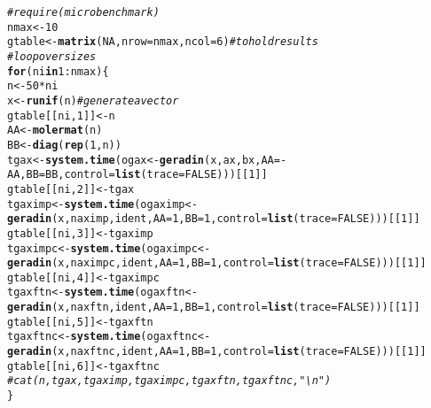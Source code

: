 \documentclass[10pt]{article}\usepackage[]{graphicx}\usepackage[]{color}
\makeatletter
\newcommand{\hlnum}[1]{\textcolor[rgb]{0.686,0.059,0.569}{#1}}%
\newcommand{\hlcom}[1]{\textcolor[rgb]{0.678,0.584,0.686}{\textit{#1}}}%
\newcommand{\hlopt}[1]{\textcolor[rgb]{0,0,0}{#1}}%
\newcommand{\hlstd}[1]{\textcolor[rgb]{0.345,0.345,0.345}{#1}}%
\newcommand{\hlkwa}[1]{\textcolor[rgb]{0.161,0.373,0.58}{\textbf{#1}}}%
\newcommand{\hlkwb}[1]{\textcolor[rgb]{0.69,0.353,0.396}{#1}}%
\newcommand{\hlkwc}[1]{\textcolor[rgb]{0.333,0.667,0.333}{#1}}%
\newcommand{\hlkwd}[1]{\textcolor[rgb]{0.737,0.353,0.396}{\textbf{#1}}}%
\newenvironment{kframe}{%
 \def\at@end@of@kframe{}%
 \ifinner\ifhmode%
  \def\at@end@of@kframe{\end{minipage}}%
  \begin{minipage}{\columnwidth}%
 \fi\fi%
 \def\FrameCommand##1{\hskip\@totalleftmargin \hskip-\fboxsep
 \colorbox{shadecolor}{##1}\hskip-\fboxsep
     \hskip-\linewidth \hskip-\@totalleftmargin \hskip\columnwidth}%
 \MakeFramed {\advance\hsize-\width
   \@totalleftmargin\z@ \linewidth\hsize
   \@setminipage}}%
 {\par\unskip\endMakeFramed%
 \at@end@of@kframe}
\newenvironment{knitrout}{}{} %
\makeatother
\begin{document}
\begin{knitrout}
\begin{kframe}
\begin{alltt}
\hlcom{# require(microbenchmark)}
\hlstd{nmax}\hlkwb{<-}\hlnum{10}
\hlstd{gtable}\hlkwb{<-}\hlkwd{matrix}\hlstd{(}\hlnum{NA}\hlstd{,} \hlkwc{nrow}\hlstd{=nmax,} \hlkwc{ncol}\hlstd{=}\hlnum{6}\hlstd{)} \hlcom{# to hold results}
\hlcom{# loop over sizes}
\hlkwa{for} \hlstd{(ni} \hlkwa{in} \hlnum{1}\hlopt{:}\hlstd{nmax)\{}
  \hlstd{n}\hlkwb{<-}\hlnum{50}\hlopt{*}\hlstd{ni}
  \hlstd{x}\hlkwb{<-}\hlkwd{runif}\hlstd{(n)} \hlcom{# generate a vector }
  \hlstd{gtable[[ni,} \hlnum{1}\hlstd{]]}\hlkwb{<-}\hlstd{n}
  \hlstd{AA}\hlkwb{<-}\hlkwd{molermat}\hlstd{(n)}
  \hlstd{BB}\hlkwb{<-}\hlkwd{diag}\hlstd{(}\hlkwd{rep}\hlstd{(}\hlnum{1}\hlstd{,n))}
  \hlstd{tgax}\hlkwb{<-}\hlkwd{system.time}\hlstd{(ogax}\hlkwb{<-}\hlkwd{geradin}\hlstd{(x, ax, bx,} \hlkwc{AA}\hlstd{=}\hlopt{-}\hlstd{AA,} \hlkwc{BB}\hlstd{=BB,} \hlkwc{control}\hlstd{=}\hlkwd{list}\hlstd{(}\hlkwc{trace}\hlstd{=}\hlnum{FALSE}\hlstd{)))[[}\hlnum{1}\hlstd{]]}
  \hlstd{gtable[[ni,} \hlnum{2}\hlstd{]]}\hlkwb{<-}\hlstd{tgax}
  \hlstd{tgaximp}\hlkwb{<-}\hlkwd{system.time}\hlstd{(ogaximp}\hlkwb{<-}\hlkwd{geradin}\hlstd{(x, naximp, ident,} \hlkwc{AA}\hlstd{=}\hlnum{1}\hlstd{,} \hlkwc{BB}\hlstd{=}\hlnum{1}\hlstd{,} \hlkwc{control}\hlstd{=}\hlkwd{list}\hlstd{(}\hlkwc{trace}\hlstd{=}\hlnum{FALSE}\hlstd{)))[[}\hlnum{1}\hlstd{]]}
  \hlstd{gtable[[ni,} \hlnum{3}\hlstd{]]}\hlkwb{<-}\hlstd{tgaximp}
  \hlstd{tgaximpc}\hlkwb{<-}\hlkwd{system.time}\hlstd{(ogaximpc}\hlkwb{<-}\hlkwd{geradin}\hlstd{(x, naximpc, ident,} \hlkwc{AA}\hlstd{=}\hlnum{1}\hlstd{,} \hlkwc{BB}\hlstd{=}\hlnum{1}\hlstd{,} \hlkwc{control}\hlstd{=}\hlkwd{list}\hlstd{(}\hlkwc{trace}\hlstd{=}\hlnum{FALSE}\hlstd{)))[[}\hlnum{1}\hlstd{]]}
  \hlstd{gtable[[ni,} \hlnum{4}\hlstd{]]}\hlkwb{<-}\hlstd{tgaximpc}
  \hlstd{tgaxftn}\hlkwb{<-}\hlkwd{system.time}\hlstd{(ogaxftn}\hlkwb{<-}\hlkwd{geradin}\hlstd{(x, naxftn, ident,} \hlkwc{AA}\hlstd{=}\hlnum{1}\hlstd{,} \hlkwc{BB}\hlstd{=}\hlnum{1}\hlstd{,} \hlkwc{control}\hlstd{=}\hlkwd{list}\hlstd{(}\hlkwc{trace}\hlstd{=}\hlnum{FALSE}\hlstd{)))[[}\hlnum{1}\hlstd{]]}
  \hlstd{gtable[[ni,} \hlnum{5}\hlstd{]]}\hlkwb{<-}\hlstd{tgaxftn}
  \hlstd{tgaxftnc}\hlkwb{<-}\hlkwd{system.time}\hlstd{(ogaxftnc}\hlkwb{<-}\hlkwd{geradin}\hlstd{(x, naxftnc, ident,} \hlkwc{AA}\hlstd{=}\hlnum{1}\hlstd{,} \hlkwc{BB}\hlstd{=}\hlnum{1}\hlstd{,} \hlkwc{control}\hlstd{=}\hlkwd{list}\hlstd{(}\hlkwc{trace}\hlstd{=}\hlnum{FALSE}\hlstd{)))[[}\hlnum{1}\hlstd{]]}
  \hlstd{gtable[[ni,} \hlnum{6}\hlstd{]]}\hlkwb{<-}\hlstd{tgaxftnc}
\hlcom{#  cat(n,tgax, tgaximp, tgaximpc, tgaxftn, tgaxftnc,"\textbackslash{}n")}
\hlstd{\}}


\end{alltt}
\end{kframe}
\end{knitrout}
\end{document}
